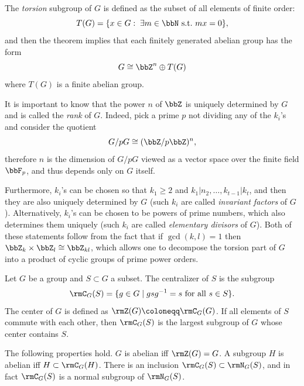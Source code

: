 \begin{rem}
    The \emph{torsion} subgroup of $G$ is defined as the subset of all elements of finite order:
    \[T(G)=\{x\in G:\;\exists m\in\bbN\text{ s.t.\ } mx=0\},\]
    and then the theorem implies that each finitely generated abelian group has the form
    \[G\cong \bbZ^n\oplus T(G)\]
    where $T(G)$ is a finite abelian group.
    
    It is important to know that the power $n$ of $\bbZ$ is uniquely determined by $G$ and is called the \emph{rank} of $G$. Indeed, pick a prime $p$ not dividing any of the $k_i$'s and consider the quotient
    \[G\slash pG\cong (\bbZ\slash p\bbZ)^n,\]
    therefore $n$ is the dimension of $G\slash pG$ viewed as a vector space over the finite field $\bbF_p$, and thus depends only on $G$ itself.

    Furthermore, $k_i$'s can be chosen so that $k_1\geq 2$ and $k_1|n_2,\ldots, k_{t-1}|k_t$, and then they are also uniquely determined by $G$ (such $k_i$ are called \emph{invariant factors} of $G$). Alternatively, $k_i$'s can be chosen to be powers of prime numbers, which also determines them uniquely (such $k_i$ are called \emph{elementary divisors} of $G$). Both of these statements follow from the fact that if $\gcd(k,l)=1$ then $\bbZ_k\times \bbZ_l\cong \bbZ_{kl}$, which allows one to decompose the torsion part of $G$ into a product of cyclic groups of prime power orders.
\end{rem}


\begin{defn}[Centralizer]
    Let $G$ be a group and $S\subset G$ a subset. The centralizer of $S$ is the subgroup
    \[\rmC_G(S)=\{g\in G\mid gsg^{-1}=s \text{ for all }s\in S\}.\]
    The center of $G$ is defined as $\rmZ(G)\coloneqq \rmC_G(G)$. If all elements of $S$ commute with each other, then $\rmC_G(S)$ is the largest subgroup of $G$ whose center contains $S$.
    
    The following properties hold. $G$ is abelian iff $\rmZ(G)=G$. A subgroup $H$ is abelian iff $H\subset \rmC_G(H)$. There is an inclusion $\rmC_G(S)\subset \rmN_G(S)$, and in fact $\rmC_G(S)$ is a normal subgroup of $\rmN_G(S)$.
\end{defn}

